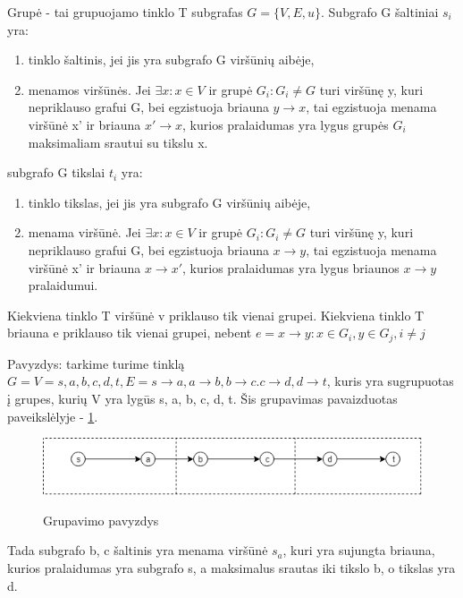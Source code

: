 Grupė - tai grupuojamo tinklo T subgrafas $G= \{V, E, u\}$. Subgrafo G šaltiniai $s_i$ yra:
\begin{enumerate}
	\item  tinklo šaltinis, jei jis yra subgrafo G viršūnių aibėje,
	\item  menamos viršūnės. Jei $\exists x: x \in V$ ir grupė $G_i : G_i \neq G$ turi viršūnę y, kuri nepriklauso grafui G, bei egzistuoja briauna $y \rightarrow x$, tai egzistuoja menama viršūnė x' ir briauna $x' \rightarrow x$, kurios pralaidumas yra lygus grupės $G_i$ maksimaliam srautui su tikslu x.
\end{enumerate}
subgrafo G tikslai $t_i$ yra:
\begin{enumerate}
	\item  tinklo tikslas, jei jis yra subgrafo G viršūnių aibėje,
	\item  menama viršūnė. Jei $\exists x: x \in V$ ir grupė $G_i : G_i \neq G$ turi viršūnę y, kuri nepriklauso grafui G, bei egzistuoja briauna $x \rightarrow y$, tai egzistuoja menama viršūnė x' ir briauna $x \rightarrow x'$, kurios pralaidumas yra lygus briaunos $x \rightarrow y$ pralaidumui.
\end{enumerate}

Kiekviena tinklo T viršūnė v priklauso tik vienai grupei. Kiekviena tinklo T briauna e priklauso tik vienai grupei, nebent $e = x \rightarrow y : x \in G_i, y \in G_j, i \neq j$

Pavyzdys: tarkime turime tinklą $G = {V={s, a, b, c, d, t}, E={s  \rightarrow a, a \rightarrow b, b \rightarrow c. c \rightarrow d, d \rightarrow t}}$, kuris yra sugrupuotas į grupes, kurių V yra lygūs {s, a}, {b, c}, {d, t}. Šis grupavimas pavaizduotas paveikslėlyje - \ref{fig:grupavimas}.
\begin{figure}[h]
	\caption{Grupavimo pavyzdys}
	\centering
	\includegraphics[width=\textwidth]{img/grupes_pavyzdziui.png}
	\label{fig:grupavimas}
\end{figure}

Tada subgrafo {b, c} šaltinis yra menama viršūnė $s_a$, kuri yra sujungta briauna, kurios pralaidumas yra subgrafo {s, a} maksimalus srautas iki tikslo b, o tikslas yra d.
